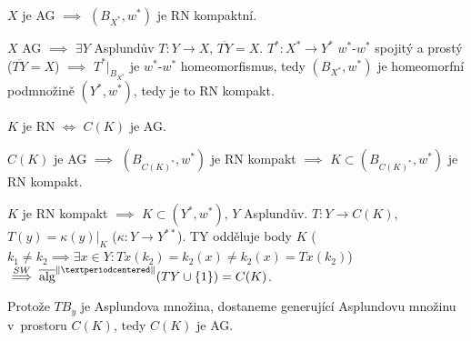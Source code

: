 \documentclass[12pt]{article}					%
\begin{document}
\begin{tvrzeni}
	$X$ je AG $\implies$ $(B_{X^*}, w^*)$ je RN kompaktní.

	\begin{dukazin}
		$X$ AG $\implies$ $\exists Y$ Asplundův $T: Y \rightarrow X$, $\overline{TY} = X$. $T^*: X^* \rightarrow Y^*$ $w^*$-$w^*$ spojitý a prostý ($\overline{TY} = X$) $\implies$ $T^*|_{B_{X^*}}$ je $w^*$-$w^*$ homeomorfismus, tedy $(B_{X^*}, w^*)$ je homeomorfní podmnožině $(Y^*, w^*)$, tedy je to RN kompakt.
	\end{dukazin}

	$K$ je RN $\Leftrightarrow$ $C(K)$ je AG.

	\begin{dukazin}
		$C(K)$ je AG $\implies$ $(B_{C(K)^*}, w^*)$ je RN kompakt $\implies$ $K \subset (B_{C(K)^*}, w^*)$ je RN kompakt.

		$K$ je RN kompakt $\implies$ $K \subset (Y^*, w^*)$, $Y$ Asplundův. $T: Y \rightarrow C(K)$, $T(y) = κ(y)|_K$ ($κ: Y \rightarrow Y^{**}$). TY odděluje body $K$ ($k_1 ≠ k_2 \implies \exists x \in Y: Tx(k_2) = k_2(x) ≠ k_2(x) = Tx(k_2)$) $\overset{SW}\implies \overline{\alg}^{\|·\|}(TY \cup \{1\}) = C(K)$.

		Protože $TB_y$ je Asplundova množina, dostaneme generující Asplundovu množinu v~prostoru $C(K)$, tedy $C(K)$ je AG.
	\end{dukazin}
\end{tvrzeni}

\pagebreak
\end{document}
